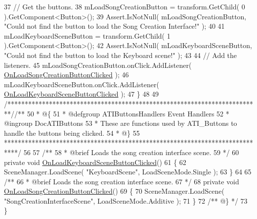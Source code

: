 \begin{DoxyCodeInclude}
37         \textcolor{comment}{// Get the buttons.}
38         mLoadSongCreationButton = transform.GetChild( 0 ).GetComponent<Button>();
39         Assert.IsNotNull( mLoadSongCreationButton, \textcolor{stringliteral}{"Could not find the button to load the Song Creation
       Interface!"} );
40 
41         mLoadKeyboardSceneButton = transform.GetChild( 1 ).GetComponent<Button>();
42         Assert.IsNotNull( mLoadKeyboardSceneButton, \textcolor{stringliteral}{"Could not find the button to load the Keyboard scene!"}
       );
43 
44         \textcolor{comment}{// Add the listeners.}
45         mLoadSongCreationButton.onClick.AddListener( 
      \hyperlink{group___a_t_i_buttons_unity_ga6f6e66c53a80c3bcd9b7e7238a3b82fd}{OnLoadSongCreationButtonClicked} );
46         mLoadKeyboardSceneButton.onClick.AddListener( 
      \hyperlink{group___a_t_i_buttons_unity_ga1b9e9b75184e9e26309cc14bda37ad8a}{OnLoadKeyboardSceneButtonClicked} );
47     \}
48 
49     \textcolor{comment}{/*************************************************************************/}\textcolor{comment}{/** }
50 \textcolor{comment}{    * @\{}
51 \textcolor{comment}{    * @defgroup ATIButtonsHandlers Event Handlers}
52 \textcolor{comment}{    * @ingroup DocATIButtons}
53 \textcolor{comment}{    * These are functions used by ATI\_Buttons to handle the buttons being clicked.}
54 \textcolor{comment}{    * @\}}
55 \textcolor{comment}{    ****************************************************************************/}
56 \textcolor{comment}{}
57 \textcolor{comment}{    /**}
58 \textcolor{comment}{    * @brief Loads the song creation interface scene.}
59 \textcolor{comment}{    */}
60     \textcolor{keyword}{private} \textcolor{keywordtype}{void} \hyperlink{group___a_t_i_buttons_unity_ga1b9e9b75184e9e26309cc14bda37ad8a}{OnLoadKeyboardSceneButtonClicked}()
61     \{
62         SceneManager.LoadScene( \textcolor{stringliteral}{"KeyboardScene"}, LoadSceneMode.Single );
63     \}
64 \textcolor{comment}{}
65 \textcolor{comment}{    /**}
66 \textcolor{comment}{     * @brief Loads the song creation interface scene.}
67 \textcolor{comment}{    */}
68     \textcolor{keyword}{private} \textcolor{keywordtype}{void} \hyperlink{group___a_t_i_buttons_unity_ga6f6e66c53a80c3bcd9b7e7238a3b82fd}{OnLoadSongCreationButtonClicked}()
69     \{
70         SceneManager.LoadScene( \textcolor{stringliteral}{"SongCreationInterfaceScene"}, LoadSceneMode.Additive );
71     \}\textcolor{comment}{}
72 \textcolor{comment}{    /** @\} */}
73 \}
\end{DoxyCodeInclude}
 